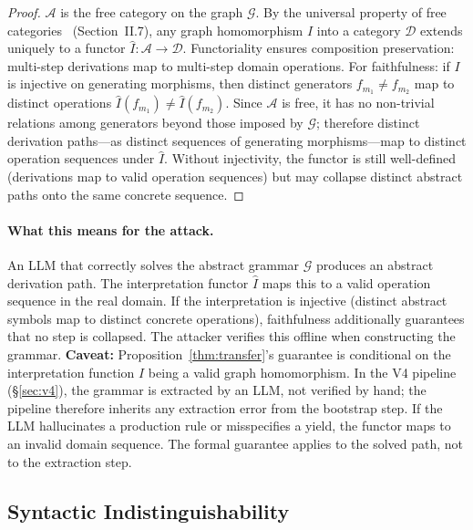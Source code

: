\documentclass[letterpaper,twocolumn,10pt]{article}
\theoremstyle{definition}
\theoremstyle{remark}
\begin{document}
\begin{proof}
$\mathcal{A}$ is the free category on the graph $\mathcal{G}$.
By the universal property of free categories~\cite{maclane1971categories}
(Section~II.7), any graph homomorphism $I$ into a category $\mathcal{D}$ extends
uniquely to a functor $\hat{I}\colon \mathcal{A} \to \mathcal{D}$.
Functoriality ensures composition preservation: multi-step derivations map to
multi-step domain operations.
For faithfulness: if $I$ is injective on generating morphisms, then distinct
generators $f_{m_1} \neq f_{m_2}$ map to distinct operations
$\hat{I}(f_{m_1}) \neq \hat{I}(f_{m_2})$.
Since $\mathcal{A}$ is free, it has no non-trivial relations among generators
beyond those imposed by $\mathcal{G}$; therefore distinct derivation paths---as
distinct sequences of generating morphisms---map to distinct operation sequences
under $\hat{I}$.
Without injectivity, the functor is still well-defined (derivations map to valid
operation sequences) but may collapse distinct abstract paths onto the same
concrete sequence.
\end{proof}

\paragraph{What this means for the attack.}
An LLM that correctly solves the abstract grammar $\mathcal{G}$ produces an
abstract derivation path.
The interpretation functor $\hat{I}$ maps this to a valid operation sequence in
the real domain.
If the interpretation is injective (distinct abstract symbols map to distinct
concrete operations), faithfulness additionally guarantees that no step is
collapsed.
The attacker verifies this offline when constructing the grammar.
\textbf{Caveat:} Proposition~\ref{thm:transfer}'s guarantee is conditional on the
interpretation function $I$ being a valid graph homomorphism.
In the V4 pipeline (\S\ref{sec:v4}), the grammar is extracted by an LLM, not
verified by hand; the pipeline therefore inherits any extraction error from the
bootstrap step.
If the LLM hallucinates a production rule or misspecifies a yield, the functor
maps to an invalid domain sequence.
The formal guarantee applies to the solved path, not to the extraction step.

\subsection{Syntactic Indistinguishability}\label{sec:indistinguish}
\end{document}
